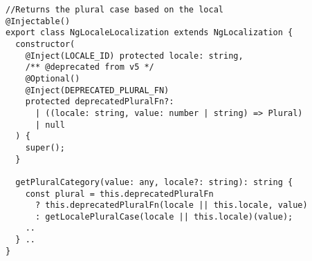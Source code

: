 \begin{verbatim}
//Returns the plural case based on the local
@Injectable()
export class NgLocaleLocalization extends NgLocalization {
  constructor(
    @Inject(LOCALE_ID) protected locale: string,
    /** @deprecated from v5 */
    @Optional()
    @Inject(DEPRECATED_PLURAL_FN)
    protected deprecatedPluralFn?:
      | ((locale: string, value: number | string) => Plural)
      | null
  ) {
    super();
  }

  getPluralCategory(value: any, locale?: string): string {
    const plural = this.deprecatedPluralFn
      ? this.deprecatedPluralFn(locale || this.locale, value)
      : getLocalePluralCase(locale || this.locale)(value);
    ..
  } ..
}
\end{verbatim}
